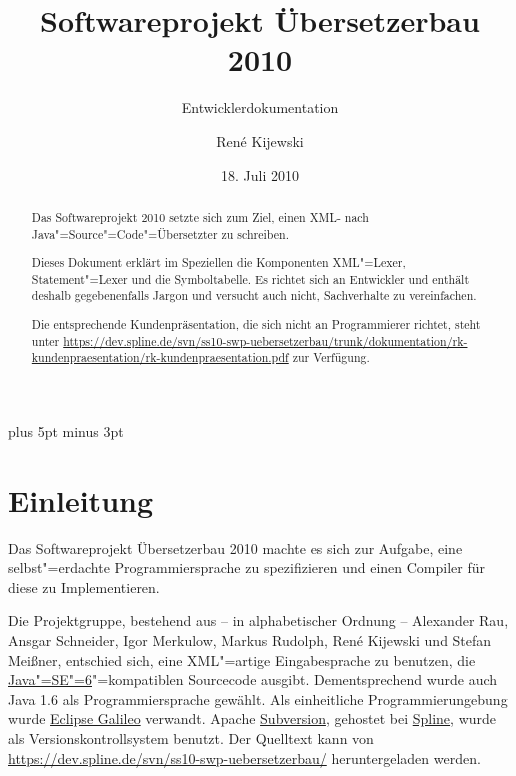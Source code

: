 \documentclass[10pt,a4paper,ngerman,titlepage,tocindentauto]{scrartcl}
\newcommand{\link}[1]{\href{#1}{#1}}
\begin{document}
	\begin{titlepage}
		\titlehead{\texttt{[image: graphiken/Fub-logo.pdf]}}
		\title{Softwareprojekt Übersetzerbau 2010} 
		\subtitle{Entwicklerdokumentation}
		\author{René Kijewski} 
		\date{18. Juli 2010 \vfill}
		\maketitle
	\end{titlepage}
	
	\begin{abstract}
		Das Softwareprojekt 2010 setzte sich zum Ziel, einen XML- nach Java"=Source"=Code"=Übersetzter
		zu schreiben.
		
		Dieses Dokument erklärt im Speziellen die Komponenten XML"=Lexer, Statement"=Lexer
		und die Symboltabelle. Es richtet sich an Entwickler und enthält deshalb gegebenenfalls
		Jargon und versucht auch nicht, Sachverhalte zu vereinfachen.
		
		Die entsprechende Kundenpräsentation, die sich nicht an Programmierer richtet, steht unter
		\link{https://dev.spline.de/svn/ss10-swp-uebersetzerbau/trunk/dokumentation/rk-kundenpraesentation/rk-kundenpraesentation.pdf}
		zur Verfügung.
	\end{abstract}

	{
		\pagestyle{empty}
		\tableofcontents
		\newpage
	}
	
	\parskip 7pt plus 5pt minus 3pt
	\setcounter{page}{1}
	\section{Einleitung}
		Das Softwareprojekt Übersetzerbau 2010 machte es sich zur Aufgabe, eine selbst"=erdachte Programmiersprache
		zu spezifizieren und einen Compiler für diese zu Implementieren.
		
		Die Projektgruppe, bestehend aus – in alphabetischer Ordnung –
			Alexander Rau,
			Ansgar Schneider,
			Igor Merkulow,
			Markus Rudolph,
			René Kijewski und
			Stefan Meißner,
		entschied sich, eine XML"=artige Eingabesprache zu benutzen, die
		\href{http://java.sun.com/javase/6/}{Java"=SE"=6}"=kompatiblen Sourcecode ausgibt.
		Dementsprechend wurde auch Java 1.6 als Programmiersprache gewählt.
		Als einheitliche Programmierungebung wurde \href{http://www.eclipse.org/galileo/}{Eclipse Galileo} verwandt.
		Apache \href{http://subversion.apache.org/}{Subversion}, gehostet bei \href{http://dev.spline.de/}{Spline}, wurde als
		Versionskontrollsystem benutzt. Der Quelltext kann von \link{https://dev.spline.de/svn/ss10-swp-uebersetzerbau/}
		heruntergeladen werden.
		
\end{document}
